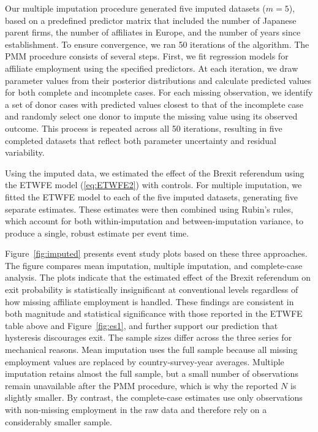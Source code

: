 \documentclass[preprint,11pt,authoryear]{elsarticle}
\begin{document}
Our multiple imputation procedure generated five imputed datasets ($m=5$), based on a predefined predictor matrix that included the number of Japanese parent firms, the number of affiliates in Europe, and the number of years since establishment. To ensure convergence, we ran 50 iterations of the algorithm.
The PMM procedure consists of several steps. First, we fit regression models for affiliate employment using the specified predictors. At each iteration, we draw parameter values from their posterior distributions and calculate predicted values for both complete and incomplete cases.  
For each missing observation, we identify a set of donor cases with predicted values closest to that of the incomplete case and randomly select one donor to impute the missing value using its observed outcome.  
This process is repeated across all 50 iterations, resulting in five completed datasets that reflect both parameter uncertainty and residual variability.  


Using the imputed data, we estimated the effect of the Brexit referendum using the ETWFE model (\ref{eq:ETWFE2}) with controls.
For multiple imputation, we fitted the ETWFE model to each of the five imputed datasets, generating five separate estimates. These estimates were then combined using Rubin’s rules, which account for both within-imputation and between-imputation variance, to produce a single, robust estimate per event time.



Figure~\ref{fig:imputed} presents event study plots based on these three approaches. The figure compares mean imputation, multiple imputation, and complete-case analysis. The plots indicate that the estimated effect of the Brexit referendum on exit probability is statistically insignificant at conventional levels regardless of how missing affiliate employment is handled. These findings are consistent in both magnitude and statistical significance with those reported in the ETWFE table above and Figure~\ref{fig:es1}, and further support our prediction that hysteresis discourages exit. The sample sizes differ across the three series for mechanical reasons. Mean imputation uses the full sample because all missing employment values are replaced by country-survey-year averages. Multiple imputation retains almost the full sample, but a small number of observations remain unavailable after the PMM procedure, which is why the reported $N$ is slightly smaller. By contrast, the complete-case estimates use only observations with non-missing employment in the raw data and therefore rely on a considerably smaller sample.
\end{document}
